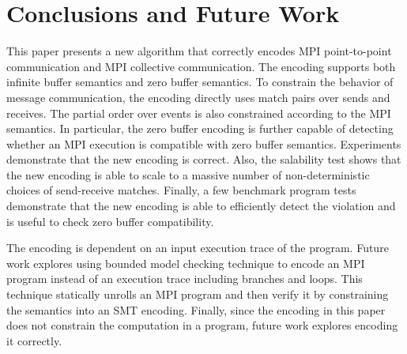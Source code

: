 \section{Conclusions and Future Work}
This paper presents a new algorithm that correctly encodes MPI point-to-point communication and MPI collective communication. The encoding supports both infinite buffer semantics and zero buffer semantics. To constrain the behavior of message communication, the encoding directly uses match pairs over sends and receives. The partial order over events is also constrained according to the MPI semantics. In particular, the zero buffer encoding is further capable of detecting whether an MPI execution is compatible with zero buffer semantics. Experiments demonstrate that the new encoding is correct. Also, the salability test shows that the new encoding is able to scale to a massive number of non-deterministic choices of send-receive matches. Finally, a few benchmark program tests demonstrate that the new encoding is able to efficiently detect the violation and is useful to check zero buffer compatibility. 

The encoding is dependent on an input execution trace of the program. Future work explores using bounded model checking technique to encode an MPI program instead of an execution trace including branches and loops. This technique statically unrolls an MPI program and then verify it by constraining the semantics into an SMT encoding. Finally, since the encoding in this paper does not constrain the computation in a program, future work explores encoding it correctly. 
